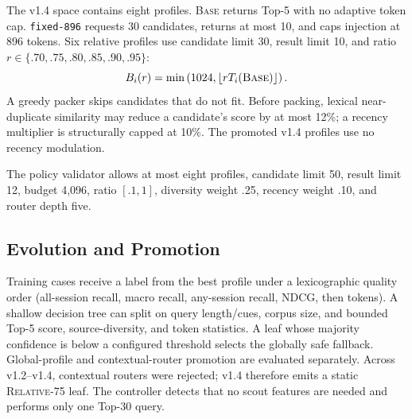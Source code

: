 \documentclass[10pt]{article}
\newcommand{\base}{\textsc{Base}\xspace}
\newcommand{\rel}{\textsc{Relative-75}\xspace}
\newcommand{\code}[1]{\texttt{#1}}
\begin{document}
The v1.4 space contains eight profiles. \base returns Top-5 with no adaptive
token cap. \code{fixed-896} requests 30 candidates, returns at most 10, and caps
injection at 896 tokens. Six relative profiles use candidate limit 30, result
limit 10, and ratio $r \in \{.70,.75,.80,.85,.90,.95\}$:
\begin{equation}
  B_i(r) = \min\left(1024,\left\lfloor r T_i(\base)\right\rfloor\right).
\end{equation}
A greedy packer skips candidates that do not fit. Before packing, lexical
near-duplicate similarity may reduce a candidate's score by at most 12\%; a
recency multiplier is structurally capped at 10\%. The promoted v1.4 profiles
use no recency modulation.

The policy validator allows at most eight profiles, candidate limit 50, result
limit 12, budget 4,096, ratio $[.1,1]$, diversity weight .25, recency weight .10,
and router depth five.

\subsection{Evolution and Promotion}

Training cases receive a label from the best profile under a lexicographic
quality order (all-session recall, macro recall, any-session recall, NDCG, then
tokens). A shallow decision tree can split on query length/cues, corpus size,
and bounded Top-5 score, source-diversity, and token statistics. A leaf whose
majority confidence is below a configured threshold selects the globally safe
fallback. Global-profile and contextual-router promotion are evaluated
separately. Across v1.2--v1.4, contextual routers were rejected; v1.4 therefore
emits a static \rel{} leaf. The controller detects that no scout features are
needed and performs only one Top-30 query.
\end{document}
